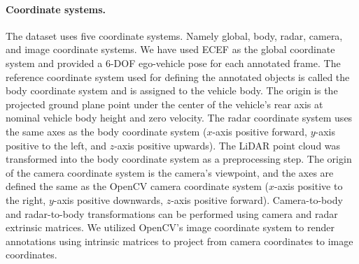 \documentclass{article}
\begin{document}
\paragraph{Coordinate systems.} The dataset uses five coordinate systems. Namely global, body, radar, camera, and image coordinate systems. We have used ECEF \citep{snay1999modern} as the global coordinate system and provided a 6-DOF ego-vehicle pose for each annotated frame. The reference coordinate system used for defining the annotated objects is called the body coordinate system and is assigned to the vehicle body. The origin is the projected ground plane point under the center of the vehicle’s rear axis at nominal vehicle body height and zero velocity. The radar coordinate system uses the same axes as the body coordinate system ($x$-axis positive forward, $y$-axis positive to the left, and $z$-axis positive upwards). The LiDAR point cloud was transformed into the body coordinate system as a preprocessing step. The origin of the camera coordinate system is the camera’s viewpoint, and the axes are defined the same as the OpenCV\citep{opencv} camera coordinate system ($x$-axis positive to the right, $y$-axis positive downwards, $z$-axis positive forward). Camera-to-body and radar-to-body transformations can be performed using camera and radar extrinsic matrices. We utilized OpenCV's image coordinate system to render annotations using intrinsic matrices to project from camera coordinates to image coordinates.
\end{document}
